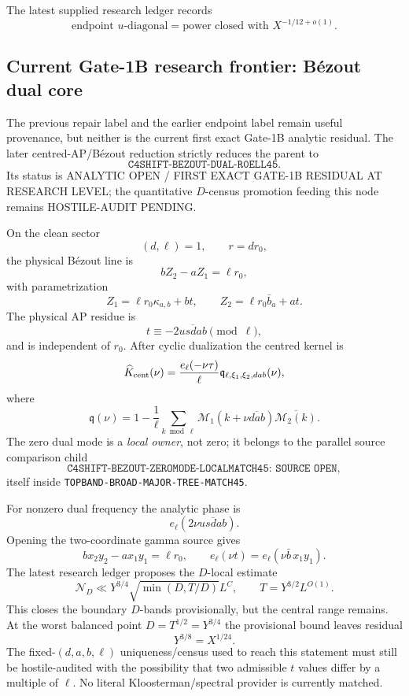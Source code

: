 \documentclass[11pt]{article}
\theoremstyle{definition}
\newcommand{\1}{\mathbf 1}
\newcommand{\status}[1]{\textsf{#1}}
\begin{document}
The latest supplied research ledger records
\[
\boxed{
\text{endpoint }u\text{-diagonal}
=
\text{power closed with }X^{-1/12+o(1)}.
}
\tag{G1B-diag-status}
\]

\subsection{Current Gate-1B research frontier: B\'ezout dual core}

The previous repair label  and the earlier endpoint label
 remain useful provenance, but neither is the current
first exact Gate-1B analytic residual.  The later centred-AP/B\'ezout reduction strictly
reduces the parent  to
\[
\boxed{\texttt{C4SHIFT-BEZOUT-DUAL-R0ELL45}}.
\]
Its status is \status{ANALYTIC OPEN / FIRST EXACT GATE-1B RESIDUAL AT RESEARCH LEVEL}; the
quantitative $D$-census promotion feeding this node remains \status{HOSTILE-AUDIT PENDING}.

On the clean sector
\[
(d,\ell)=1,\qquad r=d r_0,
\]
the physical B\'ezout line is
\[
\boxed{bZ_2-aZ_1=\ell r_0},
\]
with parametrization
\[
Z_1=\ell r_0\kappa_{a,b}+bt,
\qquad
Z_2=\ell r_0\bar b_a+at.
\]
The physical AP residue is
\[
\boxed{t\equiv-2\overline{usdab}\pmod\ell},
\]
and is independent of $r_0$.  After cyclic dualization the centred kernel is
\[
\widehat K_{\rm cent}(\nu)
=
\frac{e_\ell(-\nu\tau)}{\ell}
\mathfrak q_{\ell,\xi_1,\xi_2,dab}(\nu),
\]
where
\[
\mathfrak q(\nu)
=
1-\frac1\ell\sum_{k\bmod\ell}
\mathcal M_1(k+\nu\overline{dab})\overline{\mathcal M_2(k)}.
\]
The zero dual mode is a \emph{local owner}, not zero; it belongs to the parallel source
comparison child
\[
\boxed{\texttt{C4SHIFT-BEZOUT-ZEROMODE-LOCALMATCH45: SOURCE OPEN}},
\]
itself inside \texttt{TOPBAND-BROAD-MAJOR-TREE-MATCH45}.

For nonzero dual frequency the analytic phase is
\[
e_\ell\!\left(2\nu\overline{usdab}\right).
\]
Opening the two-coordinate gamma source gives
\[
bx_2y_2-a x_1y_1=\ell r_0,
\qquad
 e_\ell(\nu t)=e_\ell(\nu\bar b\,x_1y_1).
\]
The latest research ledger proposes the $D$-local estimate
\[
\mathcal N_D
\ll
Y^{3/4}\sqrt{\min(D,T/D)}L^C,
\qquad T=Y^{3/2}L^{O(1)}.
\]
This closes the boundary $D$-bands provisionally, but the central range remains.  At the
worst balanced point $D=T^{1/2}=Y^{3/4}$ the provisional bound leaves residual
\[
Y^{3/8}=X^{1/24}.
\]
The fixed-$(d,a,b,\ell)$ uniqueness/census used to reach this statement must still be
hostile-audited with the possibility that two admissible $t$ values differ by a multiple
of $\ell$.  No literal Kloosterman/spectral provider is currently matched.
\end{document}
